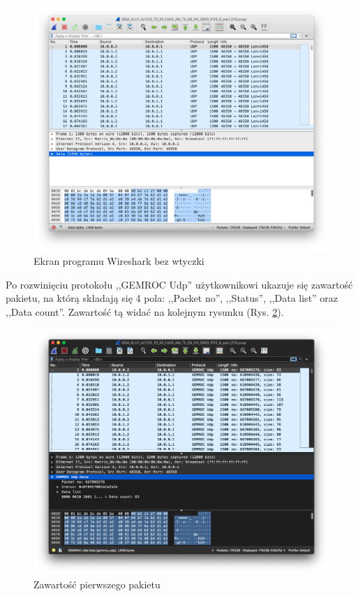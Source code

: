 \documentclass[a4paper, 12pt, twoside, openright]{article}
\begin{document}
		\begin{figure}[H]
			\centering
				\includegraphics[width=1.0\textwidth]{img/screenshot_no_dissector.png}
			\caption{Ekran programu Wireshark bez wtyczki}
			\label{fig:no_dis}
		\end{figure}


	Po rozwinięciu protokołu ,,GEMROC Udp'' użytkownikowi ukazuje się zawartość pakietu, na którą
	składają się 4 pola: ,,Packet no'', ,,Status'', ,,Data list'' oraz ,,Data count''.
	Zawartość tą widać na kolejnym rysunku (Rys. \ref{fig:dis_pack}).

		\begin{figure}[H]
			\centering
				\includegraphics[width=1.0\textwidth]{img/screenshot_dissector_list.png}
			\caption{Zawartość pierwszego pakietu}
			\label{fig:dis_pack}
		\end{figure}
\end{document}
